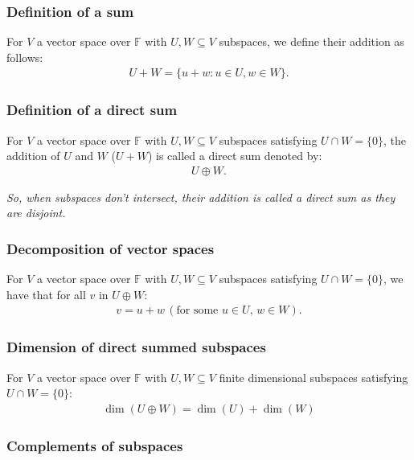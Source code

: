 \documentclass[a4paper, 12pt, twoside]{article}
\begin{document}
\subsubsection{Definition of a sum}

For $V$ a vector space over $\mathbb{F}$ with $U, W \subseteq V$
subspaces, we define their addition as follows:
\begin{align*}
  U + W = \{u + w : u \in U, w \in W\}.
\end{align*}

\subsubsection{Definition of a direct sum}

For $V$ a vector space over $\mathbb{F}$ with $U, W \subseteq V$
subspaces satisfying $U \cap W = \{0\}$, the addition of 
$U$ and $W$ ($U + W$) is called a direct sum denoted by:
\begin{align*}
  U \oplus W.
\end{align*}

\textit{So, when subspaces don't intersect, their addition is
called a direct sum as they are disjoint.}

\subsubsection{Decomposition of vector spaces}

For $V$ a vector space over $\mathbb{F}$ with $U, W \subseteq V$
subspaces satisfying $U \cap W = \{0\}$, we have that for all $v$
in $U \oplus W$:
\begin{align*}
  v = u + w \, (\text{for some } u \in U, \, w \in W).
\end{align*}

\subsubsection{Dimension of direct summed subspaces}

For $V$ a vector space over $\mathbb{F}$ with $U, W \subseteq V$
finite dimensional subspaces satisfying $U \cap W = \{0\}$:
\begin{align*}
  \dim(U \oplus W) = \dim(U) + \dim(W)
\end{align*}

\subsubsection{Complements of subspaces}
\end{document}
